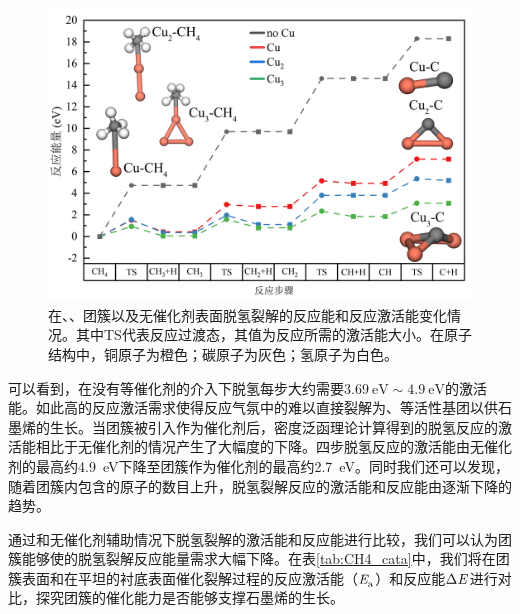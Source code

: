         \begin{figure}[!htb]
        \includegraphics{pic/CG_DFT_CuCHx.png}
        \caption{在、、团簇以及无催化剂表面脱氢裂解的反应能和反应激活能变化情况。其中TS代表反应过渡态，其值为反应所需的激活能大小。在原子结构中，铜原子为橙色；碳原子为灰色；氢原子为白色。}
        \label{fig:CG_DFT_CuCHx}
    \end{figure}

    可以看到，在没有等催化剂的介入下脱氢每步大约需要$\SI{3.69}{\electronvolt}\sim  \SI{4.9}{\electronvolt}$的激活能。如此高的反应激活需求使得反应气氛中的难以直接裂解为、等活性基团以供石墨烯的生长。当团簇被引入作为催化剂后，密度泛函理论计算得到的脱氢反应的激活能相比于无催化剂的情况产生了大幅度的下降。四步脱氢反应的激活能由无催化剂的最高约\SI{4.9}{\electronvolt}下降至团簇作为催化剂的最高约\SI{2.7}{\electronvolt}。同时我们还可以发现，随着团簇内包含的原子的数目上升，脱氢裂解反应的激活能和反应能由逐渐下降的趋势。

    通过和无催化剂辅助情况下脱氢裂解的激活能和反应能进行比较，我们可以认为团簇能够使的脱氢裂解反应能量需求大幅下降。在表\ref{tab:CH4_cata}中，我们将在团簇表面和在平坦的衬底表面催化裂解过程的反应激活能（$\it E_{\rm a}^{\rm } \it$）和反应能$\rm{\Delta} \it \it E_{\rm }^{\rm } \it$进行对比，探究团簇的催化能力是否能够支撑石墨烯的生长。

    

